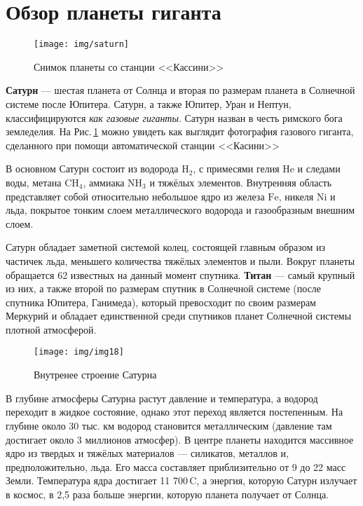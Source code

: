 \documentclass[11pt,a4paper]{article}
\begin{document}
	\section{Обзор планеты гиганта}
	\begin{figure}[h!]
		\centering
		\texttt{[image: img/saturn]}
		\caption{Снимок планеты со станции <<Кассини>>}
		\label{pic:Saturn}
	\end{figure}	
	 \textbf{Сатурн} — шестая планета от Солнца и вторая по размерам планета в Солнечной системе после Юпитера. Сатурн, а также Юпитер, Уран и Нептун, классифицируются \textit{как газовые гиганты}. Сатурн назван в честь римского бога земледелия. На Рис.\,\ref{pic:Saturn} можно увидеть как выглядит фотография газового гиганта, сделанного при помощи автоматической станции <<Касини>> \par
	 В основном Сатурн состоит из водорода $\mathrm{H_2}$, с примесями гелия $\mathrm{He}$ и следами воды, метана $\mathrm{CH_4}$, аммиака $\mathrm{NH_3}$ и тяжёлых элементов. Внутренняя область представляет собой относительно небольшое ядро из железа $\mathrm{Fe}$, никеля $\mathrm{Ni}$ и льда, покрытое тонким слоем металлического водорода и газообразным внешним слоем. \par
	 Сатурн обладает заметной системой колец, состоящей главным образом из частичек льда, меньшего количества тяжёлых элементов и пыли. Вокруг планеты обращается 62 известных на данный момент спутника. \textbf{Титан} — самый крупный из них, а также второй по размерам спутник в Солнечной системе (после спутника Юпитера, Ганимеда), который превосходит по своим размерам Меркурий и обладает единственной среди спутников планет Солнечной системы плотной атмосферой. \par
	 \begin{figure}[h]
	 	\texttt{[image: img/img18]}
	 	\centering
	 	\caption{Внутренее строение Сатурна}	
	 \end{figure}
	 В глубине атмосферы Сатурна растут давление и температура, а водород переходит в жидкое состояние, однако этот переход является постепенным. На глубине около 30 тыс. км водород становится металлическим (давление там достигает около 3 миллионов атмосфер). В центре планеты находится массивное ядро из твердых и тяжёлых материалов — силикатов, металлов и, предположительно, льда. Его масса составляет приблизительно от 9 до 22 масс Земли. Температура ядра достигает 11 700\,\degree C, а энергия, которую Сатурн излучает в космос, в 2,5 раза больше энергии, которую планета получает от Солнца.
\end{document}
